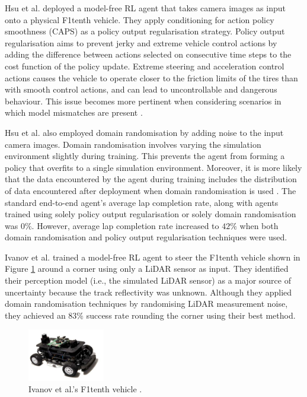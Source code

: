 Hsu et al. \cite{hsu2022} deployed a model-free RL agent that takes camera images as input onto a physical F1tenth vehicle.
They apply conditioning for action policy smoothness (CAPS) \cite{Caps2021} as a policy output regularisation strategy.
Policy output regularisation aims to prevent  jerky and extreme vehicle control actions by adding the difference between actions selected on consecutive time steps to the cost function of the policy update.
Extreme steering and acceleration control actions causes the vehicle to operate closer to the friction limits of the tires than with smooth control actions, and can lead to uncontrollable and dangerous behaviour.
This issue becomes more pertinent when considering scenarios in which model mismatches are present \cite{Chisari2021}.

Hsu et al. \cite{hsu2022} also employed domain randomisation by adding noise to the input camera images.
Domain randomisation involves varying the simulation environment slightly during training.
This prevents the agent from forming a policy that overfits to a single simulation environment.
Moreover, it is more likely that the data encountered by the agent during training includes the distribution of data encountered after deployment when domain randomisation is used \cite{Zhou2020}.
The standard end-to-end agent's average lap completion rate, along with agents trained using solely policy output regularisation or solely domain randomisation was $0\%$. 
However, average lap completion rate increased to $42\%$ when both domain randomisation and policy output regularisation techniques were used.

Ivanov et al. \cite{Ivanov2020} trained a model-free RL agent to steer the F1tenth  vehicle  shown in Figure \ref{fig:ivanov} around a corner using only a LiDAR sensor as input.
They identified their perception model (i.e., the simulated LiDAR sensor) as a major source of uncertainty because the track reflectivity was unknown.
Although they applied domain randomisation techniques by randomising LiDAR measurement noise, they achieved an $83\%$ success rate rounding the corner using their best method.

\begin{figure}[htb!]
    \centering
    \includegraphics[width=0.3\textwidth]{contents/chapt2/figs/ivanov.PNG}
    \caption[Ivanov's F1tenth vehicle]{Ivanov et al.'s F1tenth vehicle \cite{Ivanov2020}.}
    \label{fig:ivanov}
\end{figure}


